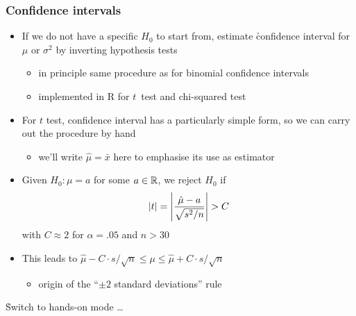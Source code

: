 \documentclass[t,notes=show]{beamer} %
\begin{document}
\begin{frame}
  \frametitle{Confidence intervals}
  
  \begin{itemize}
  \item If we do not have a specific $H_0$ to start from, estimate
    \h{confidence interval} for $\mu$ or $\sigma^2$ by inverting hypothesis
    tests
    \begin{itemize}
    \item in principle same procedure as for binomial confidence intervals
    \item implemented in R for $t$~test and chi-squared test
    \end{itemize}
  \item For $t$ test, confidence interval has a particularly simple form, so
    we can carry out the procedure by hand
    \begin{itemize}
    \item we'll write $\hat{\mu} = \bar{x}$ here to emphasise its use as
      estimator
    \end{itemize}
    \pause
  \item Given $H_0: \mu = a$ for some $a\in\mathbb{R}$, we reject $H_0$ if
    \[
    \lvert t\rvert = \left\lvert \frac{\hat{\mu} - a}{\sqrt{s^2 / n}}\right\rvert > C
    \]
    with $C\approx 2$ for $\alpha = .05$ and $n > 30$%
    \pause
  \item This leads to $\hat{\mu} - C\cdot s / \sqrt{n} \leq \mu \leq
    \hat{\mu} + C\cdot s / \sqrt{n}$
    \begin{itemize}
    \item[\hand] origin of the ``$\pm 2$ standard deviations'' rule
    \end{itemize}
  \end{itemize}
\end{frame}





\begin{frame}[c]

  \begin{center}
    \h{\Large Switch to hands-on mode \ldots}
  \end{center}
\end{frame}
\end{document}
